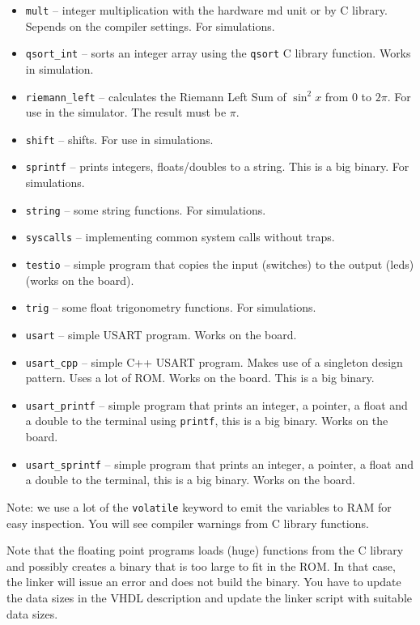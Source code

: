 \documentclass[12pt]{article}
\begin{document}
\begin{itemize}
\item \texttt{mult} -- integer multiplication with the hardware md unit or by C library. Sepends on the compiler settings. For simulations.
\item \texttt{qsort\_int} -- sorts an integer array using the \texttt{qsort} C library function. Works in simulation.
\item \texttt{riemann\_left} -- calculates the Riemann Left Sum of $\sin^2 x$ from $0$ to $2\pi$. For use in the simulator. The  result must be $\pi$.
\item \texttt{shift} -- shifts. For use in simulations.
\item \texttt{sprintf} -- prints integers, floats/doubles to a string. This is a big binary. For simulations.
\item \texttt{string} -- some string functions. For simulations.
\item \texttt{syscalls} -- implementing common system calls without traps.
\item \texttt{testio} -- simple program that copies the input (switches) to the output (leds) (works on the board).
\item \texttt{trig} -- some float trigonometry functions. For simulations.
\item \texttt{usart} -- simple USART program. Works on the board.
\item \texttt{usart\_cpp} -- simple C++ USART program. Makes use of a singleton design pattern. Uses a lot of ROM. Works on the board. This is a big binary.
\item \texttt{usart\_printf} -- simple program that prints an integer, a pointer, a float and a double to the terminal using \texttt{printf}, this is a big binary. Works on the board.
\item \texttt{usart\_sprintf} -- simple program that prints an integer, a pointer, a float and a double to the terminal, this is a big binary. Works on the board.
\end{itemize} 

Note: we use a lot of the \texttt{volatile} keyword to emit the variables to RAM for easy inspection. You will see compiler warnings from C library functions.

Note that the floating point programs loads (huge) functions from the C library and possibly creates a binary that is too large to fit in the ROM. In that case, the linker will issue an error and does not build the binary. You have to update the data sizes in the VHDL description and update the linker script with suitable data sizes.
\end{document}
